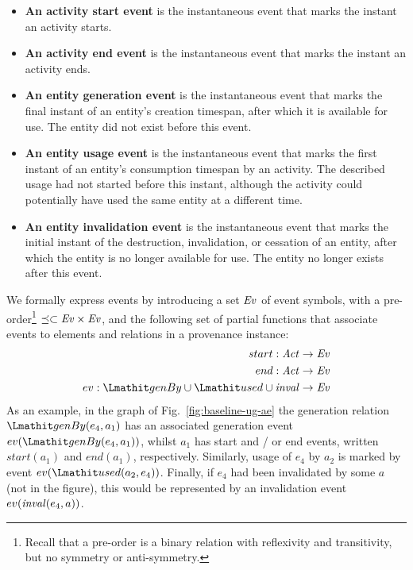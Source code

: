 \begin{itemize} %
	\item\textbf{An activity start event} is the instantaneous event that marks the instant an activity starts.
	
	\item\textbf{An activity end event} is the instantaneous event that marks the instant an activity ends.
	
	\item\textbf{An entity generation event} is the instantaneous event that marks the final instant of an entity's creation timespan, after which it is available for use. The entity did not exist before this event.
	
	\item\textbf{An entity usage event}  is the instantaneous event that marks the first instant of an entity's consumption timespan by an activity. The described usage had not started before this instant, although the activity could potentially have used the same entity at a different time.
	
	\item\textbf{An entity invalidation event} is the instantaneous event that marks the initial instant of the destruction, invalidation, or cessation of an entity, after which the entity is no longer available for use. The entity no longer exists after this event.
	
\end{itemize}

We formally express events by introducing a set $\mathit{Ev}$ of event symbols, with a pre-order\footnote{Recall that a pre-order is a binary relation with reflexivity and transitivity, but no symmetry or anti-symmetry.} $\preceq \subset \mathit{Ev} \times \mathit{Ev}$, and the following set of partial functions that associate events to elements and relations in a provenance instance:
\begin{align*}
start: \act \rightarrow \Ev \\
end: \act \rightarrow \Ev \\
ev: \wgby \cup \used \cup \inv \rightarrow \Ev
\end{align*}	
As an example, in the graph of Fig.~\ref{fig:baseline-ug-ae} the generation relation $\wgby(e_4, a_1)$ has an associated generation event $ev(\wgby(e_4, a_1))$, whilst $a_1$ has start and / or end events, written $start(a_1)$ and $end(a_1)$, respectively. Similarly, usage of $e_4$ by $a_2$ is marked by event $ev(\used(a_2, e_4))$. Finally, if $e_4$ had been invalidated by some $a$ (not in the figure), this would be represented by an invalidation event $ev(\mathit{inval}(e_4,a))$.

